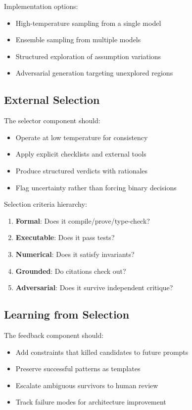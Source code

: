 \documentclass[11pt]{article}
\begin{document}
Implementation options:
\begin{itemize}
    \item High-temperature sampling from a single model
    \item Ensemble sampling from multiple models
    \item Structured exploration of assumption variations
    \item Adversarial generation targeting unexplored regions
\end{itemize}

\subsection{External Selection}

The selector component should:
\begin{itemize}
    \item Operate at low temperature for consistency
    \item Apply explicit checklists and external tools
    \item Produce structured verdicts with rationales
    \item Flag uncertainty rather than forcing binary decisions
\end{itemize}

Selection criteria hierarchy:
\begin{enumerate}
    \item \textbf{Formal}: Does it compile/prove/type-check?
    \item \textbf{Executable}: Does it pass tests?
    \item \textbf{Numerical}: Does it satisfy invariants?
    \item \textbf{Grounded}: Do citations check out?
    \item \textbf{Adversarial}: Does it survive independent critique?
\end{enumerate}

\subsection{Learning from Selection}

The feedback component should:
\begin{itemize}
    \item Add constraints that killed candidates to future prompts
    \item Preserve successful patterns as templates
    \item Escalate ambiguous survivors to human review
    \item Track failure modes for architecture improvement
\end{itemize}
\end{document}
